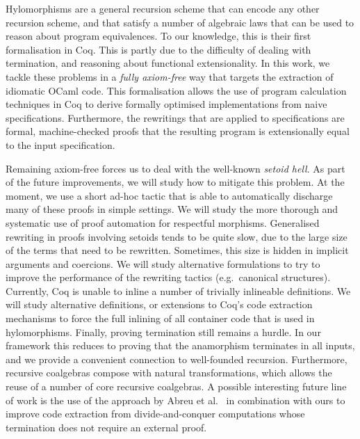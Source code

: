 \documentclass[a4paper,anonymous, UKenglish,cleveref, autoref, thm-restate]{lipics-v2021}
\begin{document}
Hylomorphisms are a general recursion scheme that can encode any other
recursion scheme, and that satisfy a number of algebraic laws that can be used
to reason about program equivalences. To our knowledge, this is their first formalisation
in Coq. This is partly due to the
difficulty of dealing with termination, and reasoning about functional
extensionality. In this work, we tackle these problems in a \emph{fully
axiom-free} way that targets the extraction of idiomatic OCaml code.  This
formalisation allows the use of program calculation techniques in Coq to derive
formally optimised implementations from naive specifications. Furthermore, the
rewritings that are applied to specifications are formal, machine-checked
proofs that the resulting program is extensionally equal to the input
specification. 

Remaining axiom-free forces us to deal with the well-known
\emph{setoid hell}. As part of the future improvements, we will study how to
mitigate this problem. At the moment, we use a short ad-hoc tactic that is able
to automatically discharge many of these proofs in simple settings.  We will
study the more thorough and systematic use of proof automation for respectful
morphisms.  Generalised rewriting in proofs involving setoids tends to be quite
slow, due to the large size of the terms that need to be rewritten. Sometimes,
this size is hidden in implicit arguments and coercions. We will study
alternative formulations to try to improve the performance of the rewriting
tactics (e.g.\ canonical structures).  Currently, Coq is unable to inline a
number of trivially inlineable definitions.  We will study alternative
definitions, or extensions to Coq's code extraction mechanisms to force the
full inlining of all container code that is used in hylomorphisms.  Finally,
proving termination still remains a hurdle. In our framework this reduces to
proving that the anamorphism
terminates in all inputs, and we provide a convenient connection to
well-founded recursion. Furthermore, recursive coalgebras compose with natural
transformations, which allows the reuse
of a number of core recursive coalgebras. A possible interesting future line of work
is the use of the approach by Abreu et al.~\cite{AbreuDHJMS23} in combination with ours to
improve code extraction from divide-and-conquer computations whose termination
does not require an external proof. 




\end{document}
